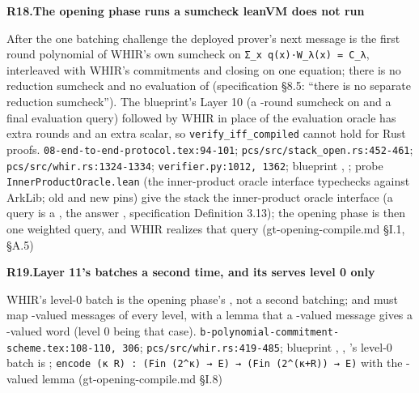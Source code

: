 \par\medskip\noindent\textbf{R18.}\enspace\textbf{The opening phase runs a sumcheck leanVM does not run}\par\nopagebreak
{} After the one batching challenge  the deployed prover's next message is the first round polynomial of WHIR's own sumcheck on \texttt{Σ\_\allowbreak{}x q(\allowbreak{}x)·W\_\allowbreak{}λ(\allowbreak{}x) =\allowbreak{} C\_\allowbreak{}λ}, interleaved with WHIR's commitments and closing on one equation; there is no reduction sumcheck and no evaluation of  (specification §8.5: ``there is no separate reduction sumcheck''). The blueprint's Layer 10 (a -round sumcheck on  and a final evaluation query) followed by WHIR in place of the evaluation oracle has  extra rounds and an extra scalar, so \texttt{verify\_\allowbreak{}iff\_\allowbreak{}compiled} cannot hold for Rust proofs.
 \texttt{08-\allowbreak{}end-\allowbreak{}to-\allowbreak{}end-\allowbreak{}protocol.\allowbreak{}tex:\allowbreak{}94-\allowbreak{}101}; \texttt{pcs/\allowbreak{}src/\allowbreak{}stack\_\allowbreak{}open.\allowbreak{}rs:\allowbreak{}452-\allowbreak{}461}; \texttt{pcs/\allowbreak{}src/\allowbreak{}whir.\allowbreak{}rs:\allowbreak{}1324-\allowbreak{}1334}; \texttt{verifier.\allowbreak{}py:\allowbreak{}1012,\allowbreak{} 1362}; blueprint , ; probe \texttt{Inner\allowbreak{}Product\allowbreak{}Oracle.\allowbreak{}lean} (the inner-product oracle interface typechecks against ArkLib; old and new pins)
 give the stack the inner-product oracle interface (a query is a , the answer , specification Definition 3.13); the opening phase is  then one weighted query, and WHIR realizes that query (gt-opening-compile.md §I.1, §A.5)

\par\medskip\noindent\textbf{R19.}\enspace\textbf{Layer 11's  batches a second time, and its  serves level 0 only}\par\nopagebreak
{} WHIR's level-0 batch is the opening phase's , not a second batching; and  must map -valued messages of every level, with a lemma that a -valued message gives a -valued word (level 0 being that case).
 \texttt{b-\allowbreak{}polynomial-\allowbreak{}commitment-\allowbreak{}scheme.\allowbreak{}tex:\allowbreak{}108-\allowbreak{}110,\allowbreak{} 306}; \texttt{pcs/\allowbreak{}src/\allowbreak{}whir.\allowbreak{}rs:\allowbreak{}419-\allowbreak{}485}; blueprint , , 
 's level-0 batch is ; \texttt{encode (\allowbreak{}κ R) :\allowbreak{} (\allowbreak{}Fin (\allowbreak{}2\textasciicircum{}κ) → E) → (\allowbreak{}Fin (\allowbreak{}2\textasciicircum{}(\allowbreak{}κ+R)) → E)} with the -valued lemma (gt-opening-compile.md §I.8)

